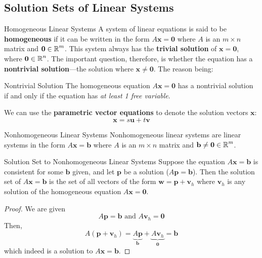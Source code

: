 \documentclass{article}
\begin{document}
\subsection{Solution Sets of Linear Systems}

\begin{definition}{Homogeneous Linear Systems}
	A system of linear equations is said to be \textbf{homogeneous} if it can be written in the form $A\mathbf{x} = \mathbf{0}$ where $A$ is an $m \times n$ matrix and $\mathbf{0} \in \operatorname{\mathbb{R}}^m$. This system always has the \textbf{trivial solution} of $\mathbf{x} = \mathbf{0}$, where $\mathbf{0} \in \operatorname{\mathbb{R}}^n$. The important question, therefore, is whether the equation has a \textbf{nontrivial solution}---the solution where $\mathbf{x} \neq \mathbf{0}$. The reason being:

	\begin{info}{Nontrivial Solution}
		The homogeneous equation $A\mathbf{x} = \mathbf{0}$ has a nontrivial solution if and only if the equation has \emph{at least 1 free variable}.
	\end{info}
\end{definition}

We can use the \textbf{parametric vector equations} to denote the solution vectors $\mathbf{x}$:
$$
	\mathbf{x}= s\mathbf{u} + t\mathbf{v}
$$

\begin{definition}{Nonhomogeneous Linear Systems}
	Nonhomogeneous linear systems are linear systems in the form $A\mathbf{x} = \mathbf{b}$ where $A$ is an $m \times n$ matrix and $\mathbf{b} \neq \mathbf{0} \in \operatorname{\mathbb{R}}^m$.
\end{definition}

\begin{theorem}{Solution Set to Nonhomogeneous Linear Systems}
	Suppose the equation $A\mathbf{x} = \mathbf{b}$ is consistent for some $\mathbf{b}$ given, and let $\mathbf{p}$ be a solution ($A\mathbf{p} = \mathbf{b}$). Then the solution set of $A\mathbf{x} = \mathbf{b}$ is the set of all vectors of the form $\mathbf{w} = \mathbf{p} + \mathbf{v}_h$ where $\mathbf{v}_h$ is any solution of the homogeneous equation $A\mathbf{x} = \mathbf{0}$.
\end{theorem}
\begin{proof}{}
	We are given
	$$
		A\mathbf{p} = \mathbf{b} \text{ and } A\mathbf{v}_h = \mathbf{0}
	$$
	Then,
	$$
		A\left( \mathbf{p} + \mathbf{v}_h \right) = \underbrace{A\mathbf{p}}_{\mathbf{b}} + \underbrace{A\mathbf{v}_h}_{\mathbf{0}} = \mathbf{b}
	$$
	which indeed is a solution to $A\mathbf{x} = \mathbf{b}$.
\end{proof}
\end{document}
